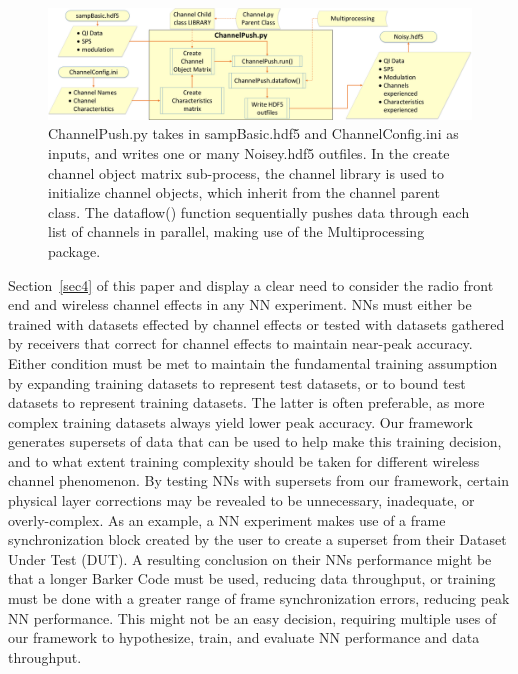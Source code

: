 \begin{figure}[ht!]
	\centering	\includegraphics[width=1\textwidth,keepaspectratio]{figs/channelpush_paper.eps}
    \caption{ChannelPush.py takes in sampBasic.hdf5 and ChannelConfig.ini as inputs, and writes one or many Noisey.hdf5 outfiles. In the create channel object matrix sub-process, the channel library is used to initialize channel objects, which inherit from the channel parent class. The dataflow() function sequentially pushes data through each list of channels in parallel, making use of the Multiprocessing package.} 
\label{fig:channeltoolsub}      
\end{figure}

Section~\ref{sec4} of this paper and \cite{8170853} display a clear need to consider the radio front end and wireless channel effects in any NN experiment. NNs must either be trained with datasets effected by channel effects or tested with datasets gathered by receivers that correct for channel effects to maintain near-peak accuracy. Either condition must be met to maintain the fundamental training assumption by expanding training datasets to represent test datasets, or to bound test datasets to represent training datasets. The latter is often preferable, as more complex training datasets always yield lower peak accuracy. Our framework generates supersets of data that can be used to help make this training decision, and to what extent training complexity should be taken for different wireless channel phenomenon. By testing NNs with supersets from our framework, certain physical layer corrections may be revealed to be unnecessary, inadequate, or overly-complex. As an example, a NN experiment makes use of a frame synchronization block created by the user to create a superset from their Dataset Under Test (DUT). A resulting conclusion on their NNs performance might be that a longer Barker Code must be used, reducing data throughput, or training must be done with a greater range of frame synchronization errors, reducing peak NN performance. This might not be an easy decision, requiring multiple uses of our framework to hypothesize, train, and evaluate NN performance and data throughput.

